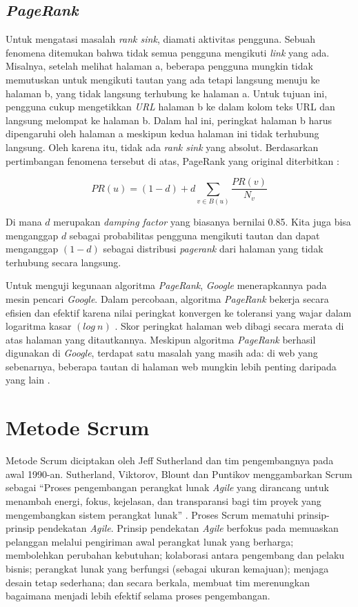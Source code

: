 \subsection{\textit{PageRank}}
Untuk mengatasi masalah \textit{rank sink}, diamati aktivitas pengguna. Sebuah fenomena ditemukan bahwa tidak semua pengguna mengikuti \textit{link} yang ada. Misalnya, setelah melihat halaman a, beberapa pengguna mungkin tidak memutuskan untuk mengikuti tautan yang ada tetapi langsung menuju ke halaman b, yang tidak langsung terhubung ke halaman a. Untuk tujuan ini, pengguna cukup mengetikkan \textit{URL} halaman b ke dalam kolom teks URL dan langsung melompat ke halaman b. Dalam hal ini, peringkat halaman b harus dipengaruhi oleh halaman a meskipun kedua halaman ini tidak terhubung langsung. Oleh karena itu, tidak ada \textit{rank sink} yang absolut. Berdasarkan pertimbangan fenomena tersebut di atas, PageRank yang original diterbitkan \citep{page1999pagerank}:

\begin{equation}
PR(u) = (1 - d) + d \sum_{v \in B(u)}^{} \frac{PR(v)}{N_{v}}
\end{equation}

Di mana $d$ merupakan \textit{damping factor} yang biasanya bernilai 0.85. Kita juga bisa menganggap $d$ sebagai probabilitas pengguna mengikuti tautan dan dapat menganggap $(1 - d)$ sebagai distribusi \textit{pagerank} dari halaman yang tidak terhubung secara langsung.

Untuk menguji kegunaan algoritma \textit{PageRank}, \textit{Google} menerapkannya pada mesin pencari \textit{Google}. Dalam percobaan, algoritma \textit{PageRank} bekerja secara efisien dan efektif karena nilai peringkat konvergen ke toleransi yang wajar dalam logaritma kasar $(log\>n)$ \citep{page1999pagerank}. Skor peringkat halaman web dibagi secara merata di atas halaman yang ditautkannya. Meskipun algoritma \textit{PageRank} berhasil digunakan di \textit{Google}, terdapat satu masalah yang masih ada: di web yang sebenarnya, beberapa tautan di halaman web mungkin lebih penting daripada yang lain \citep{xing2004weighted}.

\section{Metode Scrum}
Metode Scrum diciptakan oleh Jeff Sutherland dan tim pengembangnya pada awal 1990-an. Sutherland, Viktorov, Blount dan Puntikov menggambarkan Scrum sebagai “Proses pengembangan perangkat lunak \textit{Agile} yang dirancang untuk menambah energi, fokus, kejelasan, dan transparansi bagi tim proyek yang mengembangkan sistem perangkat lunak” \citep{sutherland2007}. Proses Scrum mematuhi prinsip-prinsip pendekatan \textit{Agile}. Prinsip pendekatan \textit{Agile} berfokus pada memuaskan pelanggan melalui pengiriman awal perangkat lunak yang berharga; membolehkan perubahan kebutuhan; kolaborasi antara pengembang dan pelaku bisnis; perangkat lunak yang berfungsi (sebagai ukuran kemajuan); menjaga desain tetap sederhana; dan secara berkala, membuat tim merenungkan bagaimana menjadi lebih efektif selama proses pengembangan.

